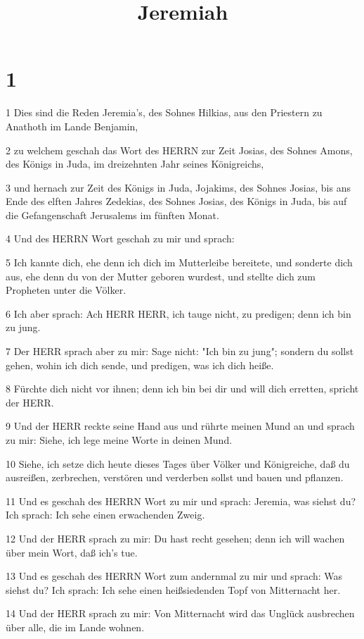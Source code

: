 

\title{Jeremiah}


\chapter{1}

\par 1 Dies sind die Reden Jeremia's, des Sohnes Hilkias, aus den Priestern zu Anathoth im Lande Benjamin,
\par 2 zu welchem geschah das Wort des HERRN zur Zeit Josias, des Sohnes Amons, des Königs in Juda, im dreizehnten Jahr seines Königreichs,
\par 3 und hernach zur Zeit des Königs in Juda, Jojakims, des Sohnes Josias, bis ans Ende des elften Jahres Zedekias, des Sohnes Josias, des Königs in Juda, bis auf die Gefangenschaft Jerusalems im fünften Monat.
\par 4 Und des HERRN Wort geschah zu mir und sprach:
\par 5 Ich kannte dich, ehe denn ich dich im Mutterleibe bereitete, und sonderte dich aus, ehe denn du von der Mutter geboren wurdest, und stellte dich zum Propheten unter die Völker.
\par 6 Ich aber sprach: Ach HERR HERR, ich tauge nicht, zu predigen; denn ich bin zu jung.
\par 7 Der HERR sprach aber zu mir: Sage nicht: "Ich bin zu jung"; sondern du sollst gehen, wohin ich dich sende, und predigen, was ich dich heiße.
\par 8 Fürchte dich nicht vor ihnen; denn ich bin bei dir und will dich erretten, spricht der HERR.
\par 9 Und der HERR reckte seine Hand aus und rührte meinen Mund an und sprach zu mir: Siehe, ich lege meine Worte in deinen Mund.
\par 10 Siehe, ich setze dich heute dieses Tages über Völker und Königreiche, daß du ausreißen, zerbrechen, verstören und verderben sollst und bauen und pflanzen.
\par 11 Und es geschah des HERRN Wort zu mir und sprach: Jeremia, was siehst du? Ich sprach: Ich sehe einen erwachenden Zweig.
\par 12 Und der HERR sprach zu mir: Du hast recht gesehen; denn ich will wachen über mein Wort, daß ich's tue.
\par 13 Und es geschah des HERRN Wort zum andernmal zu mir und sprach: Was siehst du? Ich sprach: Ich sehe einen heißsiedenden Topf von Mitternacht her.
\par 14 Und der HERR sprach zu mir: Von Mitternacht wird das Unglück ausbrechen über alle, die im Lande wohnen.
